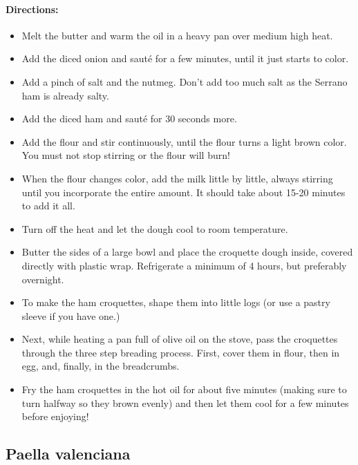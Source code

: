 \documentclass{article}
\begin{document}
\paragraph{Directions:}
\begin{itemize}
    \item Melt the butter and warm the oil in a heavy pan over medium high heat.
    \item Add the diced onion and sauté for a few minutes, until it just starts to color.
    \item Add a pinch of salt and the nutmeg. Don't add too much salt as the Serrano ham is already salty.
    \item Add the diced ham and sauté for 30 seconds more.
    \item Add the flour and stir continuously, until the flour turns a light brown color. You must not stop stirring or the flour will burn!
    \item When the flour changes color, add the milk little by little, always stirring until you incorporate the entire amount. It should take about 15-20 minutes to add it all.
    \item Turn off the heat and let the dough cool to room temperature.
    \item Butter the sides of a large bowl and place the croquette dough inside, covered directly with plastic wrap. Refrigerate a minimum of 4 hours, but preferably overnight.
    \item To make the ham croquettes, shape them into little logs (or use a pastry sleeve if you have one.)
    \item Next, while heating a pan full of olive oil on the stove, pass the croquettes through the three step breading process. First, cover them in flour, then in egg, and, finally, in the breadcrumbs.
    \item Fry the ham croquettes in the hot oil for about five minutes (making sure to turn halfway so they brown evenly) and then let them cool for a few minutes before enjoying!
\end{itemize}

\subsection{Paella valenciana}
\end{document}
